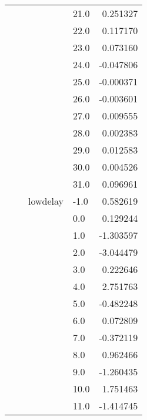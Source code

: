 \begin{tabular}{llllr}
                        &        &              &  21.0 &  0.251327 \\
                        &        &              &  22.0 &  0.117170 \\
                        &        &              &  23.0 &  0.073160 \\
                        &        &              &  24.0 & -0.047806 \\
                        &        &              &  25.0 & -0.000371 \\
                        &        &              &  26.0 & -0.003601 \\
                        &        &              &  27.0 &  0.009555 \\
                        &        &              &  28.0 &  0.002383 \\
                        &        &              &  29.0 &  0.012583 \\
                        &        &              &  30.0 &  0.004526 \\
                        &        &              &  31.0 &  0.096961 \\
                        &        & lowdelay & -1.0  &  0.582619 \\
                        &        &              &  0.0  &  0.129244 \\
                        &        &              &  1.0  & -1.303597 \\
                        &        &              &  2.0  & -3.044479 \\
                        &        &              &  3.0  &  0.222646 \\
                        &        &              &  4.0  &  2.751763 \\
                        &        &              &  5.0  & -0.482248 \\
                        &        &              &  6.0  &  0.072809 \\
                        &        &              &  7.0  & -0.372119 \\
                        &        &              &  8.0  &  0.962466 \\
                        &        &              &  9.0  & -1.260435 \\
                        &        &              &  10.0 &  1.751463 \\
                        &        &              &  11.0 & -1.414745 \\

\end{tabular}
